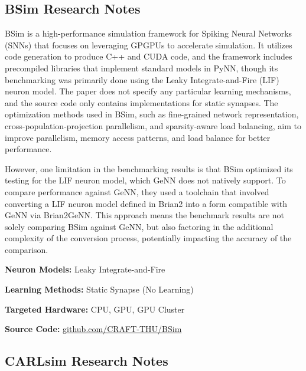 \subsection*{BSim Research Notes}\label{BSim}

BSim is a high-performance simulation framework for Spiking Neural Networks (SNNs) that focuses on leveraging GPGPUs to accelerate simulation. It utilizes code generation to produce C++ and CUDA code, and the framework includes precompiled libraries that implement standard models in PyNN, though its benchmarking was primarily done using the Leaky Integrate-and-Fire (LIF) neuron model. The paper does not specify any particular learning mechanisms, and the source code only contains implementations for static synapses. The optimization methods used in BSim, such as fine-grained network representation, cross-population-projection parallelism, and sparsity-aware load balancing, aim to improve parallelism, memory access patterns, and load balance for better performance.

However, one limitation in the benchmarking results is that BSim optimized its testing for the LIF neuron model, which GeNN does not natively support. To compare performance against GeNN, they used a toolchain that involved converting a LIF neuron model defined in Brian2 into a form compatible with GeNN via Brian2GeNN. This approach means the benchmark results are not solely comparing BSim against GeNN, but also factoring in the additional complexity of the conversion process, potentially impacting the accuracy of the comparison.

\begin{tcolorbox}[enhanced,attach boxed title to top center={yshift=-3mm,yshifttext=-1mm}, colback=blue!5!white,colframe=blue!75!black,colbacktitle=red!80!black, title=BSim at a Glance,fonttitle=\bfseries, boxed title style={size=small,colframe=red!50!black} ]

\textbf{Neuron Models:} Leaky Integrate-and-Fire

\textbf{Learning Methods:} Static Synapse (No Learning)  

\textbf{Targeted Hardware:} CPU, GPU, GPU Cluster 

\textbf{Source Code:} \href{https://github.com/CRAFT-THU/BSim}{github.com/CRAFT-THU/BSim}
\end{tcolorbox}
\subsection*{CARLsim Research Notes}\label{CARLsim}

